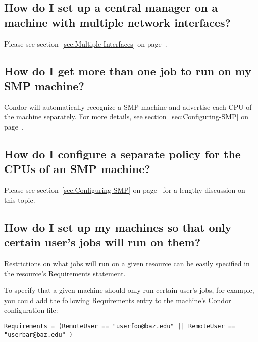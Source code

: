 \subsection*{How do I set up a central manager on a machine with multiple network interfaces?}

Please see section~\ref{sec:Multiple-Interfaces} on 
page~\pageref{sec:Multiple-Interfaces}.

\subsection*{How do I get more than one job to run on my SMP machine?}

Condor will automatically recognize a SMP machine and advertise each
CPU of the machine separately.
For more details, see section~\ref{sec:Configuring-SMP} on
page~\pageref{sec:Configuring-SMP}.

\subsection*{How do I configure a separate policy for the CPUs of an SMP machine?}

Please see section~\ref{sec:Configuring-SMP} on
page~\pageref{sec:Configuring-SMP} for a lengthy discussion on
this topic.

\subsection*{How do I set up my machines so that only certain user's jobs will run on them?}

Restrictions on what jobs will run on a given resource can be easily
specified in the resource's Requirements statement.

To specify that a given machine should only run certain user's jobs,
for example, you could add the following Requirements entry to the
machine's Condor configuration file:

\begin{verbatim}Requirements = (RemoteUser == "userfoo@baz.edu" || RemoteUser == "userbar@baz.edu" )\end{verbatim}

